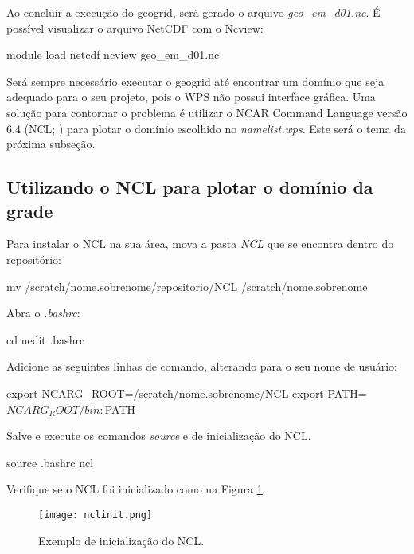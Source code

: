 \noindent Ao concluir a execução do geogrid, será gerado o arquivo \textit{geo\_em\_d01.nc}. É possível visualizar o arquivo NetCDF com o Ncview:
\bigskip

\begin{bashcode}
module load netcdf
ncview geo_em_d01.nc
\end{bashcode}
\bigskip

\noindent Será sempre necessário executar o geogrid até encontrar um domínio que seja adequado para o seu projeto, pois o WPS não possui interface gráfica. Uma solução para contornar o problema é utilizar o NCAR Command Language versão 6.4 (NCL; \cite{Ncl2017}) para plotar o domínio escolhido no \textit{namelist.wps}.  Este será o tema da próxima subseção.
\bigskip

\subsection{Utilizando o NCL para plotar o domínio da grade}
\bigskip

\noindent Para instalar o NCL na sua área, mova a pasta \textit{NCL} que se encontra dentro do repositório:
\bigskip

\begin{bashcode}
mv /scratch/nome.sobrenome/repositorio/NCL /scratch/nome.sobrenome
\end{bashcode}
\bigskip

\noindent Abra o \textit{.bashrc}:
\bigskip

\begin{bashcode}
cd
nedit .bashrc
\end{bashcode}
\bigskip

\noindent Adicione as seguintes linhas de comando, alterando para o seu nome de usuário:
\bigskip

\begin{bashcode}
export NCARG_ROOT=/scratch/nome.sobrenome/NCL
export PATH=$NCARG_ROOT/bin:$PATH
\end{bashcode}
\bigskip

\noindent Salve e execute os comandos \textit{source} e de inicialização do NCL.
\bigskip

\begin{bashcode}
source .bashrc
ncl
\end{bashcode}
\bigskip

\noindent Verifique se o NCL foi inicializado como na Figura \ref{nclinit}.
\bigskip

\begin{figure}[H]
    \centering
    \texttt{[image: nclinit.png]}
    \caption{Exemplo de inicialização do NCL.}
    \label{nclinit}
\end{figure}
\bigskip


